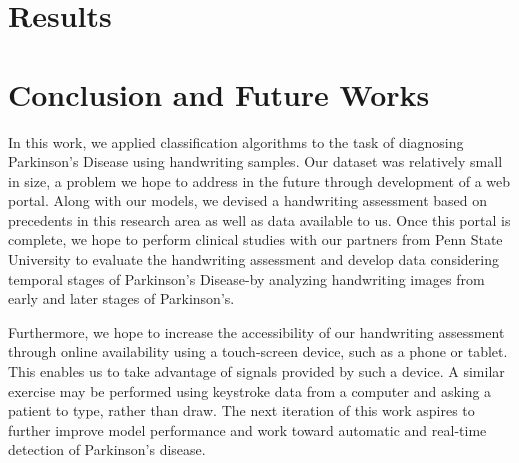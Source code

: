 \documentclass[pmlr,twocolumn,10pt]{jmlr} %
\begin{document}
\section{Results}
\label{Results}

\section{Conclusion and Future Works}
\label{Conclusion+FutureWorks} In this work, we applied classification algorithms to the task of diagnosing Parkinson's Disease using handwriting samples. Our dataset was relatively small in size, a problem we hope to address in the future through development of a web portal. Along with our models, we devised a handwriting assessment based on precedents in this research area as well as data available to us. Once this portal is complete, we hope to perform clinical studies with our partners from Penn State University to evaluate the handwriting assessment and develop data considering temporal stages of Parkinson’s Disease-by analyzing handwriting images from early and later stages of Parkinson’s. 

Furthermore, we hope to increase the accessibility of our handwriting assessment through online availability using a touch-screen device, such as a phone or tablet. This enables us to take advantage of signals provided by such a device. A similar exercise may be performed using keystroke data from a computer and asking a patient to type, rather than draw. The next iteration of this work aspires to further improve model performance and work toward automatic and real-time detection of Parkinson’s disease.
\end{document}
